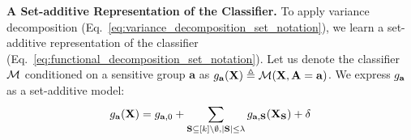 \noindent\textbf{A Set-additive Representation of the Classifier.} To apply variance decomposition (Eq.~\eqref{eq:variance_decomposition_set_notation}), we learn a set-additive representation of the classifier (Eq.~\eqref{eq:functional_decomposition_set_notation}). Let us denote the classifier $ \mathcal{M} $ conditioned on a sensitive group $ \mathbf{a} $ as $ g_{\mathbf{a}}(\mathbf{X}) \triangleq \mathcal{M}(\mathbf{X}, \mathbf{A} = \mathbf{a}) $. We express $ g_{\mathbf{a}} $ as a set-additive model:
\begin{align}
\label{eq:set_additive_classifier}
g_{\mathbf{a}}(\mathbf{X}) = g_{\mathbf{a}, 0} +  \sum_{\mathbf{S} \subseteq [k] \setminus \emptyset, |\mathbf{S}| \le \lambda} g_{\mathbf{a},\mathbf{S}}(\mathbf{X}_{\mathbf{S}}) + \delta
\end{align}
